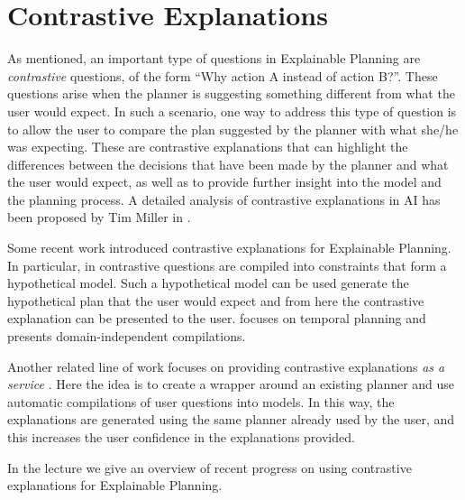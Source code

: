 \section{Contrastive Explanations}
\label{contrastive}




As mentioned, an important type of questions in Explainable Planning are \textit{contrastive} questions, of the form “Why action A
instead of action B?”.  These questions arise when the planner is suggesting something different from what the user would expect. In such a scenario, one way to address this type of question is to allow the user to compare the plan suggested by the planner with what she/he was expecting.  These are contrastive explanations that can highlight the differences between the decisions that have been made by the planner and what the user would expect, as well as to provide further insight into the model and the planning process. A detailed analysis of contrastive explanations in AI has been proposed by Tim Miller in \cite{miller:corr-18}.

Some recent work introduced contrastive explanations for Explainable Planning. In particular, in \cite{ben} contrastive questions are compiled into constraints that form a hypothetical model. Such a hypothetical model can be used generate the hypothetical plan that the user would expect and from here the contrastive explanation can be presented to the user. \cite{ben} focuses on temporal planning and presents domain-independent compilations.%

Another related line of work focuses on providing contrastive explanations \textit{as a service} \cite{xaipservice}. Here the idea is to create a wrapper around an existing planner and use automatic compilations of user questions into models. In this way, the explanations are generated using the same planner already used by the user, and this increases the user confidence  in the explanations provided.

In the lecture we give an overview of recent progress on using contrastive explanations for Explainable Planning. 
